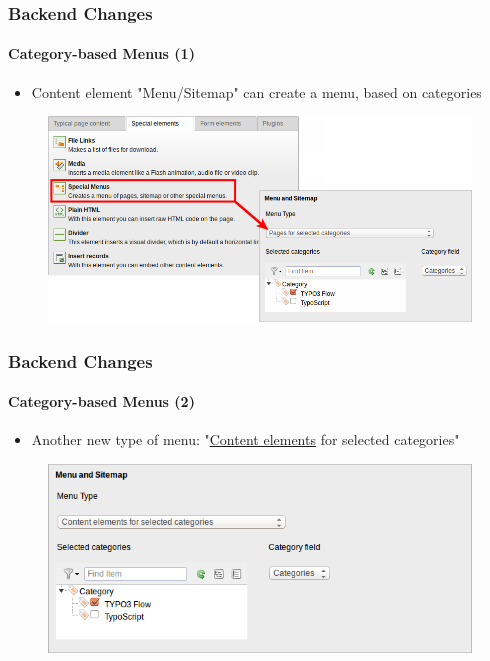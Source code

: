 
\begin{frame}[fragile]
	\frametitle{Backend Changes}
	\framesubtitle{Category-based Menus (1)}

	\begin{itemize}
		\item Content element "Menu/Sitemap" can create a menu, based on categories
	\end{itemize}

	\begin{figure}
		\includegraphics[width=0.8\linewidth]{Images/BackendChanges/CategoryBasedMenus.png}
	\end{figure}

\end{frame}


\begin{frame}[fragile]
	\frametitle{Backend Changes}
	\framesubtitle{Category-based Menus (2)}

	\begin{itemize}
		\item Another new type of menu: "\underline{Content elements} for selected categories"
	\end{itemize}

	\begin{figure}
		\includegraphics[width=0.6\linewidth]{Images/BackendChanges/ContentElementsForSelectedCategories.png}
	\end{figure}

\end{frame}

